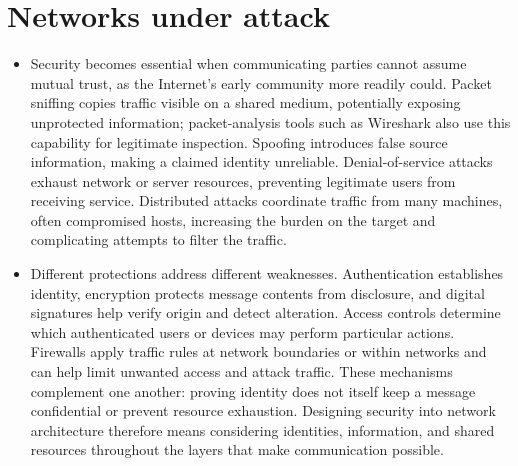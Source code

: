 \documentclass[10pt]{article}
\begin{document}
\section*{Networks under attack}

\begin{itemize}[leftmargin=1.25em, itemsep=0.3em, parsep=0pt, topsep=0pt]
    \item Security becomes essential when communicating parties cannot assume mutual trust, as the Internet's early community more readily could. Packet sniffing copies traffic visible on a shared medium, potentially exposing unprotected information; packet-analysis tools such as Wireshark also use this capability for legitimate inspection. Spoofing introduces false source information, making a claimed identity unreliable. Denial-of-service attacks exhaust network or server resources, preventing legitimate users from receiving service. Distributed attacks coordinate traffic from many machines, often compromised hosts, increasing the burden on the target and complicating attempts to filter the traffic.

    \item Different protections address different weaknesses. Authentication establishes identity, encryption protects message contents from disclosure, and digital signatures help verify origin and detect alteration. Access controls determine which authenticated users or devices may perform particular actions. Firewalls apply traffic rules at network boundaries or within networks and can help limit unwanted access and attack traffic. These mechanisms complement one another: proving identity does not itself keep a message confidential or prevent resource exhaustion. Designing security into network architecture therefore means considering identities, information, and shared resources throughout the layers that make communication possible.
\end{itemize}

\end{document}
